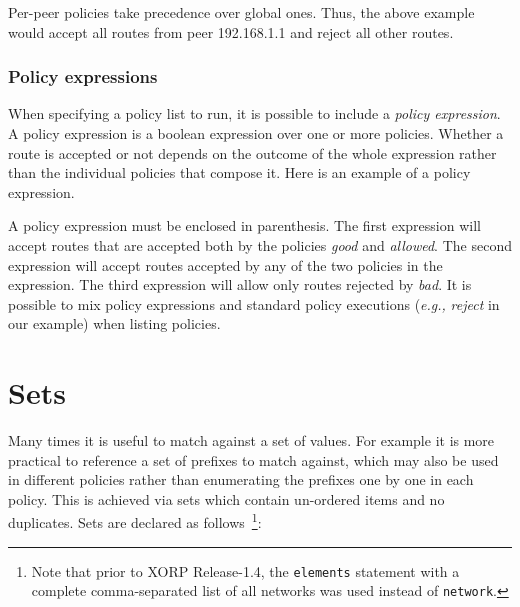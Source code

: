 Per-peer policies take precedence over global ones.  Thus, the above example
would accept all routes from peer 192.168.1.1 and reject all other routes.

\subsubsection{Policy expressions}
When specifying a policy list to run, it is possible to include a {\em policy
expression}.  A policy expression is a boolean expression over one or more
policies.  Whether a route is accepted or not depends on the outcome of the
whole expression rather than the individual policies that compose it.  Here is
an example of a policy expression.

\noindent{}

A policy expression must be enclosed in parenthesis.  The first expression will
accept routes that are accepted both by the policies {\em good} and {\em
allowed}.  The second expression will accept routes accepted by any of the two
policies in the expression.  The third expression will allow only routes
rejected by {\em bad}.  It is possible to mix policy expressions and standard
policy executions ({\em e.g.,} {\em reject} in our example) when listing
policies.

\section{Sets}
Many times it is useful to match against a set of values.  For example it is
more practical to reference a set of prefixes to match against, which may also
be used in different policies rather than enumerating the prefixes one by one in
each policy.  This is achieved via sets which contain un-ordered items and no
duplicates.  Sets are declared as follows~\footnote{Note that prior to XORP
Release-1.4, the {\tt elements} statement with a complete comma-separated
list of all networks was used instead of {\tt network}.}:

